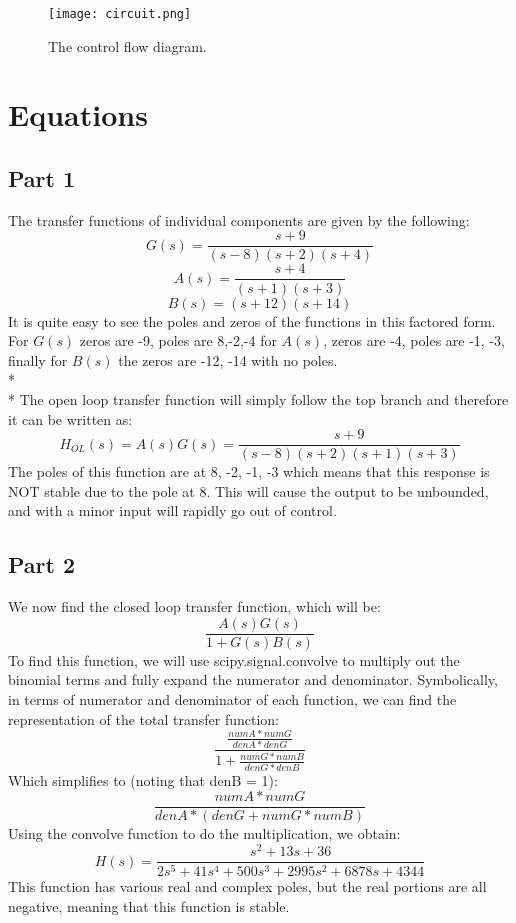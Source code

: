 \documentclass[12pt]{report}
\def\br{\hspace*{\fill} \\* }
\begin{document}
\begin{figure}[h]
   \centering
    \texttt{[image: circuit.png]}
    \caption{The control flow diagram.}
\end{figure}

\hypertarget{equations}{%
\chapter{Equations}\label{equations}}

\hypertarget{part-1}{%
\section{Part 1}\label{part-1}}

The transfer functions of individual components are given by the
following: \[ G(s)=\frac{s+9}{(s-8)(s+2)(s+4)} \]
\[ A(s)= \frac{s+4}{(s+1)(s+3)} \] \[ B(s)= (s+12)(s+14) \] It is quite
easy to see the poles and zeros of the functions in this factored form.
For \(G(s)\) zeros are -9, poles are 8,-2,-4 for \(A(s)\), zeros are -4,
poles are -1, -3, finally for \(B(s)\) the zeros are -12, -14 with no
poles. \br \br The open loop transfer function will simply follow the
top branch and therefore it can be written as:
\[ H_{OL}(s)=A(s)G(s)=\frac{s+9}{(s-8)(s+2)(s+1)(s+3)} \] The poles of
this function are at 8, -2, -1, -3 which means that this response is NOT
stable due to the pole at 8. This will cause the output to be unbounded,
and with a minor input will rapidly go out of control.

\hypertarget{part-2}{%
\section{Part 2}\label{part-2}}

We now find the closed loop transfer function, which will be:
\[ \frac{A(s)G(s)}{1+G(s)B(s)} \] To find this function, we will use
scipy.signal.convolve to multiply out the binomial terms and fully
expand the numerator and denominator. Symbolically, in terms of
numerator and denominator of each function, we can find the
representation of the total transfer function:
\[ \frac{\frac{numA*numG}{denA*denG}}{1+\frac{numG*numB}{denG*denB}} \]
Which simplifies to (noting that denB = 1):
\[ \frac{numA*numG}{denA*(denG+numG*numB)} \] Using the convolve
function to do the multiplication, we obtain:
\[ H(s)=\frac{s^2+13s+36}{2s^5+41s^4+500s^3+2995s^2+6878s+4344} \] This
function has various real and complex poles, but the real portions are
all negative, meaning that this function is stable.
\end{document}
